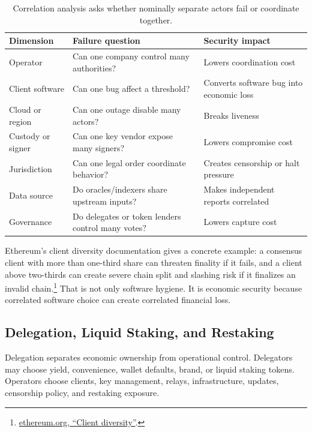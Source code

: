 \begin{table}[htbp]
\centering
\small
\renewcommand{\arraystretch}{1.16}
\begin{tabularx}{\textwidth}{@{}>{\RaggedRight\arraybackslash}p{}>{\RaggedRight\arraybackslash}p{}X@{}}
\toprule
Dimension & Failure question & Security impact \\
\midrule
Operator & Can one company control many authorities? & Lowers coordination cost \\
Client software & Can one bug affect a threshold? & Converts software bug into economic loss \\
Cloud or region & Can one outage disable many actors? & Breaks liveness \\
Custody or signer & Can one key vendor expose many signers? & Lowers compromise cost \\
Jurisdiction & Can one legal order coordinate behavior? & Creates censorship or halt pressure \\
Data source & Do oracles/indexers share upstream inputs? & Makes independent reports correlated \\
Governance & Do delegates or token lenders control many votes? & Lowers capture cost \\
\bottomrule
\end{tabularx}
\caption{Correlation analysis asks whether nominally separate actors fail or coordinate together.}
\end{table}

Ethereum's client diversity documentation gives a concrete example: a consensus client with more than one-third share can threaten finality if it fails, and a client above two-thirds can create severe chain split and slashing risk if it finalizes an invalid chain.\footnote{\href{https://ethereum.org/developers/docs/nodes-and-clients/client-diversity/}{ethereum.org, ``Client diversity''}.} That is not only software hygiene. It is economic security because correlated software choice can create correlated financial loss.

\subsection{Delegation, Liquid Staking, and Restaking}

Delegation separates economic ownership from operational control. Delegators may choose yield, convenience, wallet defaults, brand, or liquid staking tokens. Operators choose clients, key management, relays, infrastructure, updates, censorship policy, and restaking exposure.

